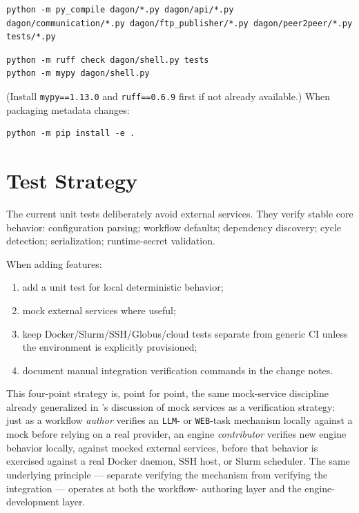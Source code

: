 \begin{lstlisting}[style=bash, caption={Compile source and tests.}]
python -m py_compile dagon/*.py dagon/api/*.py dagon/communication/*.py dagon/ftp_publisher/*.py dagon/peer2peer/*.py tests/*.py
\end{lstlisting}

\begin{lstlisting}[style=bash, caption={Lightweight quality checks.}]
python -m ruff check dagon/shell.py tests
python -m mypy dagon/shell.py
\end{lstlisting}

(Install \texttt{mypy==1.13.0} and \texttt{ruff==0.6.9} first if not already
available.) When packaging metadata changes:

\begin{lstlisting}[style=bash]
python -m pip install -e .
\end{lstlisting}

\section{Test Strategy}

The current unit tests deliberately avoid external services. They verify
stable core behavior: configuration parsing; workflow defaults; dependency
discovery; cycle detection; serialization; runtime-secret validation.

When adding features:

\begin{enumerate}[leftmargin=1.6em]
  \item add a unit test for local deterministic behavior;
  \item mock external services where useful;
  \item keep Docker/Slurm/SSH/Globus/cloud tests separate from generic CI
    unless the environment is explicitly provisioned;
  \item document manual integration verification commands in the change
    notes.
\end{enumerate}

This four-point strategy is, point for point, the same mock-service
discipline already generalized in 's discussion of
mock services as a verification strategy: just as a workflow \emph{author}
verifies an \texttt{LLM}- or \texttt{WEB}-task mechanism locally against a
mock before relying on a real provider, an engine \emph{contributor}
verifies new engine behavior locally, against mocked external services,
before that behavior is exercised against a real Docker daemon, SSH host,
or Slurm scheduler. The same underlying principle --- separate verifying the
mechanism from verifying the integration --- operates at both the workflow-
authoring layer and the engine-development layer.

